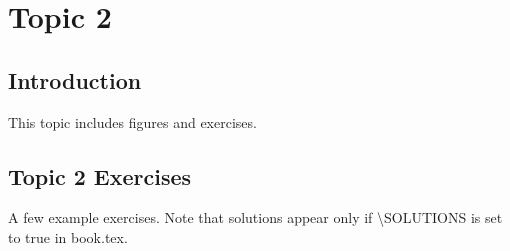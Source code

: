 
\chapter{Topic 2}\label{chap:topic2}

\section{Introduction}\label{sec:topic2}
This topic includes figures and exercises.

\section{Topic 2 Exercises}\label{sec:topic2-exercises}
A few example exercises. Note that solutions appear only if \textbackslash SOLUTIONS is set to true in book.tex.

